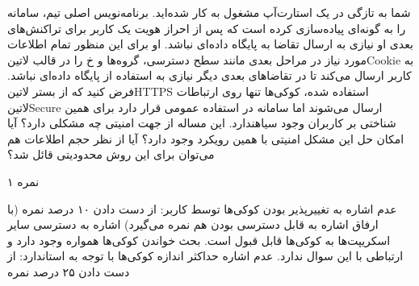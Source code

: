 
شما به تازگی در یک استارت‌آپ مشغول به کار شده‌اید.
برنامه‌نویس اصلی تیم، سامانه را به گونه‌ای پیاده‌سازی کرده است که پس از احراز هویت یک کاربر
برای تراکنش‌های بعدی او نیازی به ارسال تقاضا به پایگاه داده‌ای نباشد.
او برای این منظور تمام اطلاعات مورد نیاز در مراحل بعدی مانند سطح دسترسی، گروه‌ها و ‌خ را در قالب ‌لاتین{Cookie}
به کاربر ارسال می‌کند تا در تقاضاهای بعدی دیگر نیازی به استفاده از پایگاه داده‌ای نباشد.
فرض کنید که از بستر ‌لاتین{HTTPS} استفاده شده، کوکی‌ها تنها روی ارتباطات  لاتین{Secure} ارسال می‌شوند اما سامانه در استفاده عمومی قرار دارد برای همین شناختی بر کاربران وجود ‌سیاه{ندارد}.
این مساله از جهت امنیتی چه مشکلی دارد؟ آیا امکان حل این مشکل امنیتی با همین رویکرد وجود دارد؟
آیا از نظر حجم اطلاعات هم می‌توان برای این روش محدودیتی قائل شد؟

۱ نمره


 عدم اشاره به تغییرپذیر بودن کوکی‌ها توسط کاربر: از دست دادن ۱۰ درصد نمره (با ارفاق اشاره به قابل دسترسی بودن هم نمره می‌گیرد)
 اشاره به دسترسی سایر اسکریپت‌ها به کوکی‌ها قابل قبول است.
 بحث خواندن کوکی‌ها همواره وجود دارد و ارتباطی با این سوال ندارد.
 عدم اشاره حداکثر اندازه کوکی‌ها با توجه به استاندارد: از دست دادن ۲۵ درصد نمره


